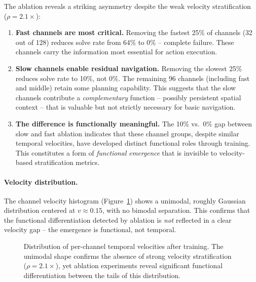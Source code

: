 \documentclass{article}
\begin{document}
The ablation reveals a striking asymmetry despite the weak velocity stratification ($\rho = 2.1\times$):

\begin{enumerate}
    \item \textbf{Fast channels are most critical.} Removing the fastest 25\% of channels (32 out of 128) reduces solve rate from 64\% to 0\% -- complete failure. These channels carry the information most essential for action execution.
    \item \textbf{Slow channels enable residual navigation.} Removing the slowest 25\% reduces solve rate to 10\%, not 0\%. The remaining 96 channels (including fast and middle) retain some planning capability. This suggests that the slow channels contribute a \emph{complementary} function -- possibly persistent spatial context -- that is valuable but not strictly necessary for basic navigation.
    \item \textbf{The difference is functionally meaningful.} The 10\% vs.\ 0\% gap between slow and fast ablation indicates that these channel groups, despite similar temporal velocities, have developed distinct functional roles through training. This constitutes a form of \emph{functional emergence} that is invisible to velocity-based stratification metrics.
\end{enumerate}

\paragraph{Velocity distribution.} The channel velocity histogram (Figure~\ref{fig:histogram}) shows a unimodal, roughly Gaussian distribution centered at $v \approx 0.15$, with no bimodal separation. This confirms that the functional differentiation detected by ablation is \emph{not} reflected in a clear velocity gap -- the emergence is functional, not temporal.

\begin{figure}[h]
\centering
{}
\caption{Distribution of per-channel temporal velocities after training. The unimodal shape confirms the absence of strong velocity stratification ($\rho = 2.1\times$), yet ablation experiments reveal significant functional differentiation between the tails of this distribution.}
\label{fig:histogram}
\end{figure}
\end{document}
